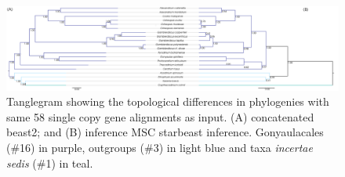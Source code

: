 \documentclass[12pt]{article}
\begin{document}
  


\begin{figure} 
\includegraphics[scale=.18]{figures/SC-MSC-BI_vs_SC-concat-BI.png} 
\caption{Tanglegram showing the topological differences in phylogenies with same 58 single copy gene alignments as input. (A) concatenated beast2; and (B) inference MSC starbeast inference. Gonyaulacales (\#16) in purple, outgroups (\#3) in light blue and taxa \textit{incertae sedis} (\#1) in teal.} 
\label{fig:tangleconcatBI}
\end{figure} 
\FloatBarrier
\end{document}
